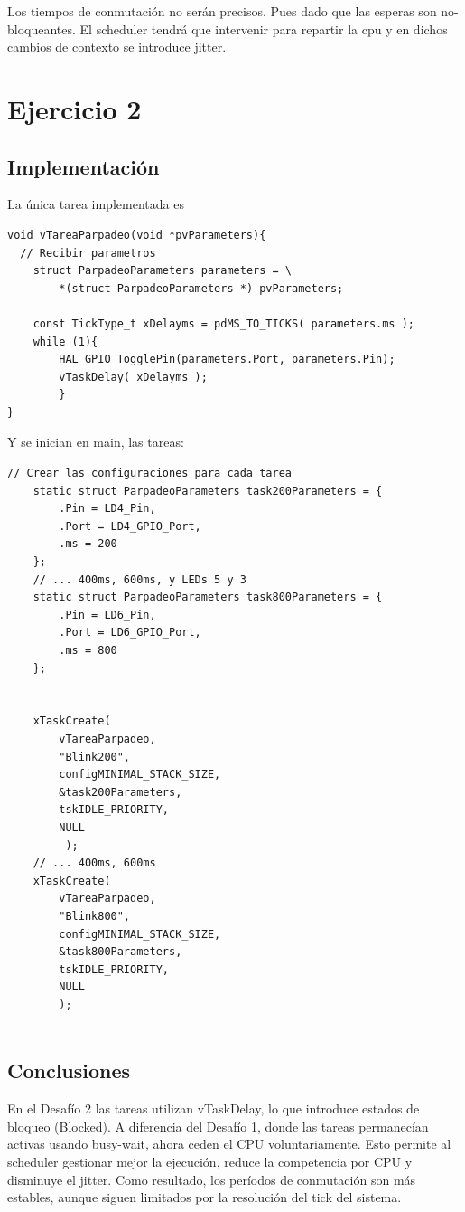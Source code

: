 \documentclass[12pt]{article}
\begin{document}
Los tiempos de conmutación no serán precisos. Pues dado que las
esperas son no-bloqueantes. El scheduler tendrá que intervenir
para repartir la cpu y en dichos cambios de contexto se introduce
jitter.
\pagebreak
\section{Ejercicio 2}
\subsection{Implementación}
La única tarea implementada es
\begin{lstlisting}[style=CStyle]
void vTareaParpadeo(void *pvParameters){
  // Recibir parametros
    struct ParpadeoParameters parameters = \
        *(struct ParpadeoParameters *) pvParameters;

    const TickType_t xDelayms = pdMS_TO_TICKS( parameters.ms );
	while (1){
		HAL_GPIO_TogglePin(parameters.Port, parameters.Pin);
		vTaskDelay( xDelayms );
        }
}
\end{lstlisting}
Y se inician en main, las tareas:
\begin{lstlisting}[style=CStyle]
    // Crear las configuraciones para cada tarea
    static struct ParpadeoParameters task200Parameters = {
        .Pin = LD4_Pin,
        .Port = LD4_GPIO_Port,
        .ms = 200
    };
    // ... 400ms, 600ms, y LEDs 5 y 3
    static struct ParpadeoParameters task800Parameters = {
        .Pin = LD6_Pin,
        .Port = LD6_GPIO_Port,
        .ms = 800
    };


    xTaskCreate(
        vTareaParpadeo,
        "Blink200",
        configMINIMAL_STACK_SIZE,
        &task200Parameters,
        tskIDLE_PRIORITY,
        NULL
         );
    // ... 400ms, 600ms
    xTaskCreate(
        vTareaParpadeo,
        "Blink800",
        configMINIMAL_STACK_SIZE,
        &task800Parameters,
        tskIDLE_PRIORITY,
        NULL
        );
        
    \end{lstlisting}
\subsection{Conclusiones}
En el Desafío 2 las tareas utilizan vTaskDelay, lo que introduce estados de bloqueo (Blocked). A diferencia del Desafío 1, donde las tareas permanecían activas usando busy-wait, ahora ceden el CPU voluntariamente. Esto permite al scheduler gestionar mejor la ejecución, reduce la competencia por CPU y disminuye el jitter. Como resultado, los períodos de conmutación son más estables, aunque siguen limitados por la resolución del tick del sistema.
        
\end{document}

